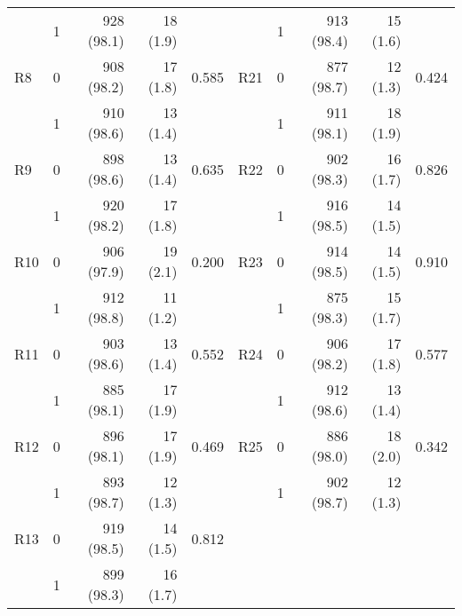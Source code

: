 \begin{table}[ht]
\begin{adjustbox}{width=\textwidth}
\begin{tabular}{lrrrr|lrrrr}
   & 1 & 928 (98.1) & 18 (1.9) &  &  & 1 & 913 (98.4) & 15 (1.6) &  \\
R8 & 0 & 908 (98.2) & 17 (1.8) & 0.585 & R21 & 0 & 877 (98.7) & 12 (1.3) & 0.424 \\
   & 1 & 910 (98.6) & 13 (1.4) &  &  & 1 & 911 (98.1) & 18 (1.9) &  \\
R9 & 0 & 898 (98.6) & 13 (1.4) & 0.635 & R22 & 0 & 902 (98.3) & 16 (1.7) & 0.826 \\
   & 1 & 920 (98.2) & 17 (1.8) &  &  & 1 & 916 (98.5) & 14 (1.5) &  \\
R10 & 0 & 906 (97.9) & 19 (2.1) & 0.200 & R23 & 0 & 914 (98.5) & 14 (1.5) & 0.910 \\
    & 1 & 912 (98.8) & 11 (1.2) &  &  & 1 & 875 (98.3) & 15 (1.7) &  \\
R11 & 0 & 903 (98.6) & 13 (1.4) & 0.552 & R24 & 0 & 906 (98.2) & 17 (1.8) & 0.577 \\
    & 1 & 885 (98.1) & 17 (1.9) &  &  & 1 & 912 (98.6) & 13 (1.4) &  \\
R12 & 0 & 896 (98.1) & 17 (1.9) & 0.469 & R25 & 0 & 886 (98.0) & 18 (2.0) & 0.342 \\
    & 1 & 893 (98.7) & 12 (1.3) &  &  & 1 & 902 (98.7) & 12 (1.3) &  \\
R13 & 0 & 919 (98.5) & 14 (1.5) & 0.812\\
    & 1 & 899 (98.3) & 16 (1.7) &      \\
  \hline
\end{tabular}
\end{adjustbox}
\endgroup
\end{table}